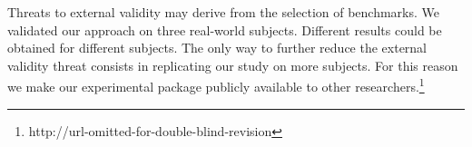 Threats to external validity may derive from the selection of
benchmarks. We validated our approach on three real-world
subjects. Different results could be obtained for different
subjects. The only way to further reduce the external validity threat
consists in replicating our study on more subjects. For this reason we
make our experimental package publicly available to other
researchers.\footnote{http://url-omitted-for-double-blind-revision}

